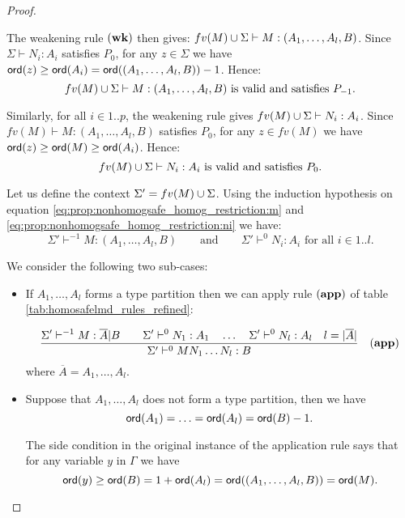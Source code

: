 \begin{proof}
\begin{itemize}
The weakening rule $\mathbf{(wk)}$ then gives:
$fv(M) \cup \Sigma \vdash M : (A_1,\ldots,A_l,B)$.
Since $\Sigma \vdash N_i : A_i$ satisfies $P_0$, for any
$z \in \Sigma$ we have ${\sf ord}(z) \geq {\sf ord}(A_i) = {\sf ord}((A_1,\ldots,A_l,B)) - 1$.
Hence:
\begin{equation}
fv(M) \cup \Sigma \vdash M : (A_1,\ldots,A_l,B) \mbox{ is valid
and satisfies } P_{-1}
\label{eq:prop:nonhomogsafe_homog_restriction:m}.
\end{equation}

Similarly, for all $i \in 1..p$, the weakening rule gives $fv(M) \cup \Sigma \vdash N_i : A_i$.
Since $fv(M) \vdash M : (A_1,\ldots,A_l,B)$ satisfies $P_0$,
for any $z \in fv(M)$ we have ${\sf ord}(z) \geq {\sf ord}(M) \geq {\sf ord}(A_i)$. Hence:
\begin{equation}
fv(M) \cup \Sigma \vdash N_i : A_i \mbox{ is valid and satisfies }
P_0 \label{eq:prop:nonhomogsafe_homog_restriction:ni}.
\end{equation}

Let us define the context $\Sigma' = fv(M) \cup \Sigma$. Using the induction hypothesis on equation
\ref{eq:prop:nonhomogsafe_homog_restriction:m} and \ref{eq:prop:nonhomogsafe_homog_restriction:ni} we have:
$$
\Sigma' \vdash^{-1} M : (A_1,\ldots,A_l,B) \qquad \mbox{and} \qquad
\Sigma' \vdash^0 N_i : A_i \mbox{ for all } i \in 1..l.
$$


We consider the following two sub-cases:
\begin{itemize}
\item If $A_1, \ldots, A_l$ forms a type partition then we can apply
rule $\mathbf{(app)}$ of table \ref{tab:homosafelmd_rules_refined}:

$$ \frac{\displaystyle \Sigma' \vdash^{-1} M : \overline{A} | B
                                        \qquad \Sigma' \vdash^{0} N_1 :
                                        A_1
                                        \quad \ldots \quad \Sigma' \vdash^{0} N_l :
                                        A_l
                                        \quad l = |\overline{A}|
                                        }{\Sigma'  \vdash^{0} M N_1 \ldots N_l : B} \quad  \mathbf{(app)}
$$
where $\overline{A} = A_1, \ldots, A_l$.

\item  Suppose that $A_1, \ldots, A_l$ does not form a type partition, then we
have $${\sf ord}(A_1) = \ldots = {\sf ord}(A_l) = {\sf ord}(B) - 1.$$

The side condition in the original instance of the application rule
says that for any variable $y$ in $\Gamma$ we have
$${\sf ord}(y) \geq {\sf ord}(B) = 1 + {\sf ord}(A_l) = {\sf ord}((A_1,\ldots, A_l,B)) = {\sf ord}(M).$$


\end{itemize}
\end{itemize}
\end{proof}
